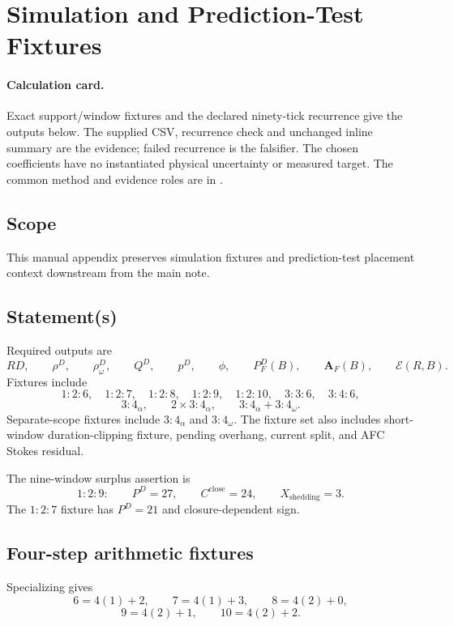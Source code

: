 
\section{Simulation and Prediction-Test Fixtures}\label{manual:simulation-prediction-test-fixtures}

\paragraph{Calculation card.}
Exact support/window fixtures and the declared ninety-tick recurrence give
the outputs below. The supplied CSV, recurrence check and unchanged inline
summary are the evidence; failed recurrence is the falsifier. The chosen
coefficients have no instantiated physical uncertainty or measured target.
The common method and evidence roles are in .



\subsection{Scope}\label{manual:simfix:scope}
This manual appendix preserves simulation fixtures and prediction-test placement context downstream from the main note.

\subsection{Statement(s)}\label{manual:simfix:statements}
Required outputs are
\[
RD,
\qquad
\rho^D,
\qquad
\rho^D_\omega,
\qquad
Q^D,
\qquad
p^D,
\qquad
\phi,
\qquad
P^D_F(B),
\qquad
\mathbf A_F(B),
\qquad
\mathcal E(R,B).
\]
\label{app:rd-tests:support-reductions}
Fixtures include
\[
1{:}2{:}6,
\quad
1{:}2{:}7,
\quad
1{:}2{:}8,
\quad
1{:}2{:}9,
\quad
1{:}2{:}10,
\quad
3{:}3{:}6,
\quad
3{:}4{:}6,
\]
\[
3{:}4_\alpha,
\qquad
2\times3{:}4_\alpha,
\qquad
3{:}4_\alpha+3{:}4_\omega.
\]
Separate-scope fixtures include \(3{:}4_\alpha\) and \(3{:}4_\omega\). The fixture set also includes short-window duration-clipping fixture, pending overhang, current split, and AFC Stokes residual.


The nine-window surplus assertion is
\[
1{:}2{:}9:
\qquad
P^D=27,
\qquad
C^{\mathrm{close}}=24,
\qquad
X_{\mathrm{shedding}}=3.
\]
The \(1{:}2{:}7\) fixture has \(P^D=21\) and closure-dependent sign.



\subsection{Four-step arithmetic fixtures}
\label{manual:simfix:four-step-arithmetic}
Specializing  gives
\[
6=4(1)+2,
\qquad
7=4(1)+3,
\qquad
8=4(2)+0,
\]
\[
9=4(2)+1,
\qquad
10=4(2)+2.
\]

